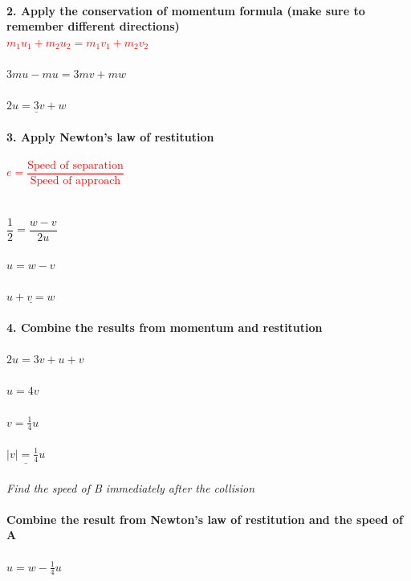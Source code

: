 \documentclass{article}[18pt]
\begin{document}
\\
\\
\\
\textbf{2. Apply the conservation of momentum formula (make sure to remember different directions)}\\
\textcolor{red}{$m_1u_1+m_2u_2=m_1v_1+m_2v_2$}\\
\\
$3mu-mu=3mv+mw$\\
\\
$\underline{2u=3v+w}$\\
\\
\textbf{3. Apply Newton's law of restitution}\\
\\
\textcolor{red}{$e=\dfrac{\text{Speed of separation}}{\text{Speed of approach}}$}\\
\\
\\
$\dfrac{1}{2}=\dfrac{w-v}{2u}$\\
\\
$u=w-v$\\
\\
$\underline{u+v=w}$\\
\\
\textbf{4. Combine the results from momentum and restitution}\\
\\
$2u=3v+u+v$\\
\\
$u=4v$\\
\\
$v=\frac{1}{4}u$\\
\\
$\underline{|v|=\frac{1}{4}u}$\\
\\
\textit{Find the speed of B immediately after the collision}\\
\\
\textbf{Combine the result from Newton's law of restitution and the speed of A}\\
\\
$u=w-\frac{1}{4}u$\\
\\
\end{document}
